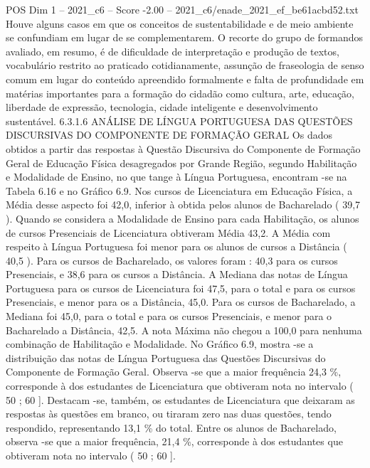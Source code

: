 \begin{textsample}{POS Dim 1 – 2021\_c6 – Score -2.00 – 2021\_c6/enade\_2021\_ef\_be61acbd52.txt}
Houve alguns casos em que os conceitos de sustentabilidade e de meio ambiente se confundiam em lugar de se complementarem.
O recorte do grupo de formandos avaliado, em resumo, é de dificuldade de interpretação e produção de textos, vocabulário restrito ao praticado cotidianamente, assunção de fraseologia de senso comum em lugar do conteúdo apreendido formalmente e falta de profundidade em matérias importantes para a formação do cidadão como cultura, arte, educação, liberdade de expressão, tecnologia, cidade inteligente e desenvolvimento sustentável. 6.3.1.6 ANÁLISE DE LÍNGUA PORTUGUESA DAS QUESTÕES DISCURSIVAS DO COMPONENTE DE FORMAÇÃO GERAL Os dados obtidos a partir das respostas à Questão Discursiva do Componente de Formação Geral de Educação Física desagregados por Grande Região, segundo Habilitação e Modalidade de Ensino, no que tange à Língua Portuguesa, encontram -se na Tabela 6.16 e no Gráfico 6.9.
Nos cursos de Licenciatura em Educação Física, a Média desse aspecto foi 42,0, inferior à obtida pelos alunos de Bacharelado ( 39,7 ).
Quando se considera a Modalidade de Ensino para cada Habilitação, os alunos de cursos Presenciais de Licenciatura obtiveram Média 43,2.
A Média com respeito à Língua Portuguesa foi menor para os alunos de cursos a Distância ( 40,5 ).
Para os cursos de Bacharelado, os valores foram : 40,3 para os cursos Presenciais, e 38,6 para os cursos a Distância.
A Mediana das notas de Língua Portuguesa para os cursos de Licenciatura foi 47,5, para o total e para os cursos Presenciais, e menor para os a Distância, 45,0.
Para os cursos de Bacharelado, a Mediana foi 45,0, para o total e para os cursos Presenciais, e menor para o Bacharelado a Distância, 42,5.
A nota Máxima não chegou a 100,0 para nenhuma combinação de Habilitação e Modalidade.
No Gráfico 6.9, mostra -se a distribuição das notas de Língua Portuguesa das Questões Discursivas do Componente de Formação Geral.
Observa -se que a maior frequência 24,3 \%, corresponde à dos estudantes de Licenciatura que obtiveram nota no intervalo ( 50 ; 60 ].
Destacam -se, também, os estudantes de Licenciatura que deixaram as respostas às questões em branco, ou tiraram zero nas duas questões, tendo respondido, representando 13,1 \% do total.
Entre os alunos de Bacharelado, observa -se que a maior frequência, 21,4 \%, corresponde à dos estudantes que obtiveram nota no intervalo ( 50 ; 60 ].

\end{textsample}
